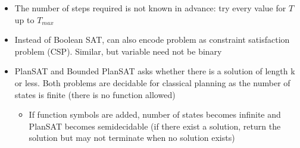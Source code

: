 \documentclass[12pt]{article}
\begin{document}
\pagebreak
\begin{itemize}
\begin{algorithm}

    \underline{function SATPLAN(init, transition, goal, $T_{max}$) returns action or failure} \\
    \
    
      return failure
      \caption{SAT plan}
\end{algorithm}

\item The number of steps required is not known in advance: try every value for $T$ up to $T_{max}$
\item Instead of Boolean SAT, can also encode problem as constraint satisfaction problem (CSP). Similar, but variable need not be binary
\item PlanSAT and Bounded PlanSAT asks whether there is a solution of length k or less. Both problems are decidable for classical planning as the number of states is finite (there is no function allowed)
\begin{itemize}
\item If function symbols are added, number of states becomes infinite and PlanSAT becomes semidecidable (if there exist a solution, return the solution but may not terminate when no solution exists)
\end{itemize}
\end{itemize}
\end{document}
